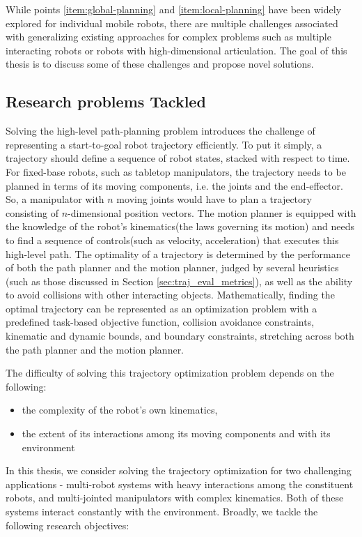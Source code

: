 While points \ref{item:global-planning} and \ref{item:local-planning} have been widely explored for individual mobile robots, there are multiple challenges associated with generalizing existing approaches for complex problems such as multiple interacting robots or robots with high-dimensional articulation. The goal of this thesis is to discuss some of these challenges and propose novel solutions.

\subsection{Research problems Tackled}

Solving the high-level path-planning problem introduces the challenge of representing a start-to-goal robot trajectory efficiently. To put it simply, a trajectory should define a sequence of robot states, stacked with respect to time. For fixed-base robots, such as tabletop manipulators, the trajectory needs to be planned in terms of its moving components, i.e. the joints and the end-effector. So, a manipulator with $n$ moving joints would have to plan a trajectory consisting of $n$-dimensional position vectors. The motion planner is equipped with the knowledge of the robot's kinematics(the laws governing its motion) and needs to find a sequence of controls(such as velocity, acceleration) that executes this high-level path. The optimality of a trajectory is determined by the performance of both the path planner and the motion planner, judged by several heuristics (such as those discussed in Section \ref{sec:traj_eval_metrics}), as well as the ability to avoid collisions with other interacting objects. Mathematically, finding the optimal trajectory can be represented as an optimization problem with a predefined task-based objective function, collision avoidance constraints, kinematic and dynamic bounds, and boundary constraints, stretching across both the path planner and the motion planner. 

The difficulty of solving this trajectory optimization problem depends on the following:
\begin{itemize}
    \item the complexity of the robot's own kinematics,
    \item the extent of its interactions among its moving components and with its environment
\end{itemize}

In this thesis, we consider solving the trajectory optimization for two challenging applications - multi-robot systems with heavy interactions among the constituent robots, and multi-jointed manipulators with complex kinematics. Both of these systems interact constantly with the environment. Broadly, we tackle the following research objectives:


